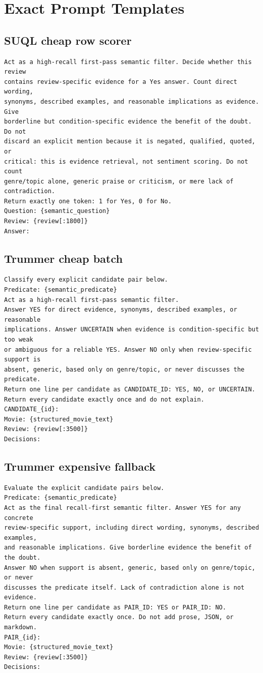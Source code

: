 \appendix\chapter{Exact Prompt Templates}
\section{SUQL cheap row scorer}
\begin{lstlisting}
Act as a high-recall first-pass semantic filter. Decide whether this review
contains review-specific evidence for a Yes answer. Count direct wording,
synonyms, described examples, and reasonable implications as evidence. Give
borderline but condition-specific evidence the benefit of the doubt. Do not
discard an explicit mention because it is negated, qualified, quoted, or
critical: this is evidence retrieval, not sentiment scoring. Do not count
genre/topic alone, generic praise or criticism, or mere lack of contradiction.
Return exactly one token: 1 for Yes, 0 for No.
Question: {semantic_question}
Review: {review[:1800]}
Answer:
\end{lstlisting}

\section{Trummer cheap batch}
\begin{lstlisting}
Classify every explicit candidate pair below.
Predicate: {semantic_predicate}
Act as a high-recall first-pass semantic filter.
Answer YES for direct evidence, synonyms, described examples, or reasonable
implications. Answer UNCERTAIN when evidence is condition-specific but too weak
or ambiguous for a reliable YES. Answer NO only when review-specific support is
absent, generic, based only on genre/topic, or never discusses the predicate.
Return one line per candidate as CANDIDATE_ID: YES, NO, or UNCERTAIN.
Return every candidate exactly once and do not explain.
CANDIDATE_{id}:
Movie: {structured_movie_text}
Review: {review[:3500]}
Decisions:
\end{lstlisting}

\section{Trummer expensive fallback}
\begin{lstlisting}
Evaluate the explicit candidate pairs below.
Predicate: {semantic_predicate}
Act as the final recall-first semantic filter. Answer YES for any concrete
review-specific support, including direct wording, synonyms, described examples,
and reasonable implications. Give borderline evidence the benefit of the doubt.
Answer NO when support is absent, generic, based only on genre/topic, or never
discusses the predicate itself. Lack of contradiction alone is not evidence.
Return one line per candidate as PAIR_ID: YES or PAIR_ID: NO.
Return every candidate exactly once. Do not add prose, JSON, or markdown.
PAIR_{id}:
Movie: {structured_movie_text}
Review: {review[:3500]}
Decisions:
\end{lstlisting}

